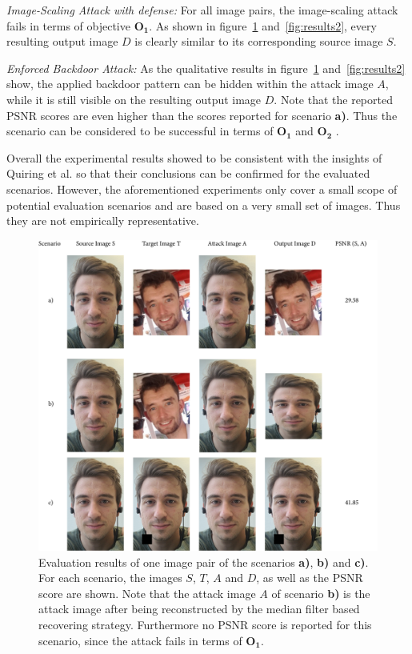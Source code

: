 \documentclass[sigconf]{acmart}
\begin{document}
\smallbreak

\textit{Image-Scaling Attack with defense:}
For all image pairs, the image-scaling attack fails in terms of objective $\boldsymbol{O_1}$.
As shown in figure~\ref{fig:ev1} and~\ref{fig:results2}, every resulting output image $D$ is clearly similar to its corresponding source image $S$.

\smallbreak

\textit{Enforced Backdoor Attack:}
As the qualitative results in figure~\ref{fig:ev1} and~\ref{fig:results2} show, the applied backdoor pattern can be hidden within the attack image $A$, while it is still visible on the resulting output image $D$.
Note that the reported PSNR scores are even higher than the scores reported for scenario \textbf{a)}.
Thus the scenario can be considered to be successful in terms of $\boldsymbol{O_1}$ and  $\boldsymbol{O_2}$ .

\smallbreak

Overall the experimental results showed to be consistent with the insights of Quiring et al. so that their conclusions can be confirmed for the evaluated scenarios.
However, the aforementioned experiments only cover a small scope of potential evaluation scenarios and are based on a very small set of images. 
Thus they are not empirically representative.

\begin{figure}[h]
  \centering
  \includegraphics[width=\linewidth]{img/eval1.png}
  \caption{Evaluation results of one image pair of the scenarios \textbf{a)}, \textbf{b)} and \textbf{c)}. For each scenario, the images $S$, $T$, $A$ and $D$, as well as the PSNR score are shown. 
  		Note that the attack image $A$ of scenario \textbf{b)} is the attack image after being reconstructed by the median filter based recovering strategy. Furthermore no PSNR score is reported for this scenario, since the attack fails in terms of $\boldsymbol{O_1}$.}
  \Description{}
  \label{fig:ev1}
\end{figure}
\end{document}
